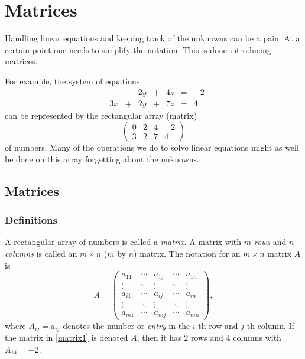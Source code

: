 \documentclass{article}
\begin{document}
\chapter{Matrices}



Handling linear equations and keeping track of the unknowns can be a pain. At
a certain point one needs to simplify the notation. This is done introducing
matrices. 

For example, the system of equations
\begin{equation}\label{equ2l}
\begin{matrix}
&&  &2y &+ &4z &= &-2\\
&3x &+ &2y &+ &7z &= &4
\end{matrix}
\end{equation}
can be represented by the rectangular array (matrix)
\begin{equation}\label{matrix1} 
\begin{pmatrix}
0 & 2 & 4 & -2\\
3 & 2 & 7 & 4
\end{pmatrix}
\end{equation}
of numbers. Many of the operations we do to solve linear equations might as well be done on this array forgetting
about the unknowns.

\section{Matrices}

\subsection{Definitions}
A rectangular array of numbers is called a \emph{matrix}. A matrix with $m$ \emph{rows} and $n$ 
\emph{columns} is called an $m\times n$ ($m$ by $n$) matrix. 
The notation for an $m\times n$ matrix $A$ is
\begin{equation}\label{matr}
A =  
\begin{pmatrix}
a_{11} & \cdots &a_{1j}& \cdots& a_{1 n} \\
\vdots & \ddots &\vdots & \ddots & \vdots\\
a_{i1} & \cdots &a_{ij}& \cdots& a_{i n} \\
\vdots & \ddots &\vdots & \ddots & \vdots\\
a_{m1} & \cdots &a_{mj}& \cdots& a_{m n}
\end{pmatrix},
\end{equation}
where $A_{ij} = a_{i j}$ denotes the number or \emph{entry} in the  $i$-th row and $j$-th column. If the matrix in \eqref{matrix1}
is denoted $A$, then it has $2$ rows and $4$ columns with $A_{14} = -2$.
\end{document}
